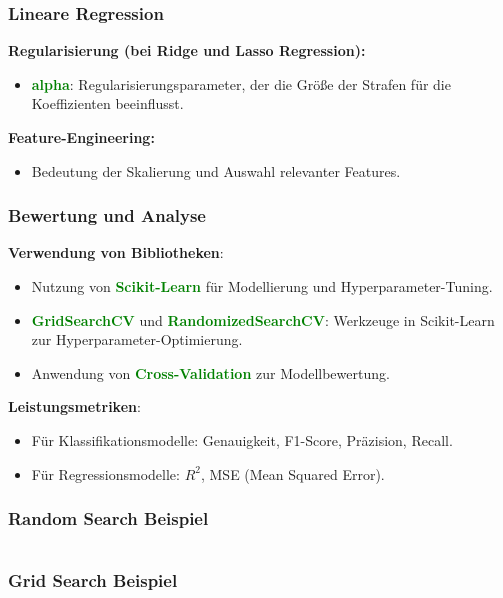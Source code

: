 \documentclass[10pt]{beamer}
\newcommand{\htgreen}[1] {{\bf \textcolor{Green}{#1}}}
\begin{document}
\begin{frame}
  \frametitle{Lineare Regression}
  {\bf Regularisierung (bei Ridge und Lasso Regression): }
    \begin{itemize}
      \item \htgreen{alpha}: Regularisierungsparameter, der die Größe der
        Strafen für die Koeffizienten beeinflusst.
    \end{itemize}

    \vspace{0.5cm}

    {\bf Feature-Engineering:}
    \begin{itemize}
      \item Bedeutung der Skalierung und Auswahl relevanter Features.
    \end{itemize}
\end{frame}

\begin{frame}
  \frametitle{Bewertung und Analyse}

  {\bf Verwendung von Bibliotheken}: 
  \begin{itemize}
    \item Nutzung von \htgreen{Scikit-Learn} für Modellierung und Hyperparameter-Tuning.
    \item \htgreen{GridSearchCV} und \htgreen{RandomizedSearchCV}: Werkzeuge in Scikit-Learn zur Hyperparameter-Optimierung.
    \item Anwendung von \htgreen{Cross-Validation} zur Modellbewertung.
  \end{itemize}

  \vspace{0.5cm}

  {\bf Leistungsmetriken}:
  \begin{itemize}
    \item Für Klassifikationsmodelle: Genauigkeit, F1-Score, Präzision, Recall.
    \item Für Regressionsmodelle: $R^2$, MSE (Mean Squared Error).
  \end{itemize}



\end{frame}

\begin{frame}[fragile]
  \frametitle{Random Search Beispiel}
  \inputminted{python}{random_example.py}
\end{frame}

\begin{frame}[fragile]
  \frametitle{Grid Search Beispiel}
  \inputminted{python}{grid_example.py}
\end{frame}
\end{document}
